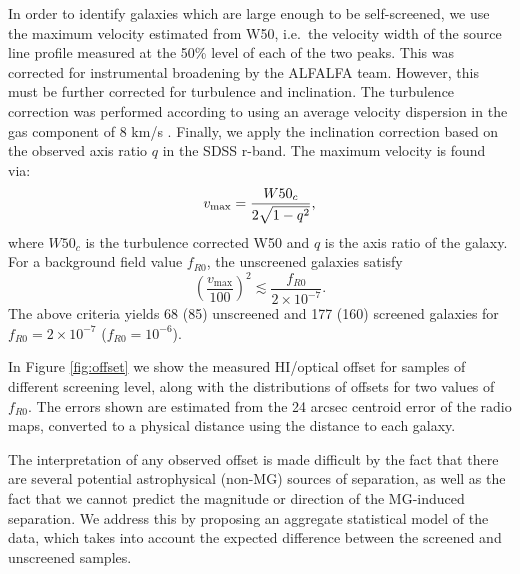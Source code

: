 \documentclass{emulateapj}
\begin{document}
In order to identify galaxies which are large enough to be self-screened,
we use the maximum velocity estimated from W50, i.e.\ the
velocity width of the source
line profile measured at the 50\% level of each of the two peaks. This was
corrected for instrumental broadening by the ALFALFA team. However, this must
be further corrected for turbulence and inclination.
The turbulence correction was performed according to \citet{tully85} using an
average velocity dispersion in the gas component of 8 km/s \citep{begum06,
geha06}. Finally, we apply the inclination correction based on the observed
axis ratio $q$ in the SDSS r-band. The maximum velocity is found via:
\begin{equation}
  v_{\rm max} = \frac{W50_c}{2 \sqrt{1 - q^2}},
\end{equation}
where $W50_c$ is the turbulence corrected W50 and $q$ is the axis ratio of
the galaxy. For a background field value $f_{R0}$, the unscreened galaxies
satisfy  \citep[see][]{jainvinu2012}
\begin{equation}
  \left(\frac{v_{\mathrm{max}}}{100}\right)^2 \lesssim
  \frac{f_{R0}}{2\times10^{-7}}.
\label{eq:unscreened}
\end{equation}
The above criteria yields 68 (85) unscreened and 177 (160) screened galaxies
for $f_{R0} = 2 \times10^{-7}$ ($f_{R0} = 10^{-6}$).

In Figure \ref{fig:offset} we show the measured HI/optical
offset for samples of different screening level, along with the
distributions of offsets for two values of $f_{R0}$.
The errors shown are estimated from the 24 arcsec centroid 
error of the radio maps, converted to a physical distance using the
distance to each galaxy.

The interpretation of any observed offset
is made difficult by the fact that there are several potential
astrophysical (non-MG) sources of separation, as well as the fact that we
cannot predict the magnitude or direction of the MG-induced separation.
We address this by proposing an aggregate statistical model of the data,
which takes into account the expected difference between the screened and
unscreened samples.
\end{document}
